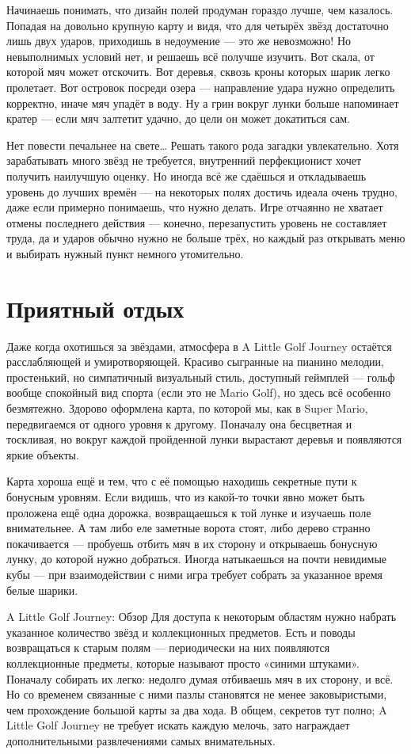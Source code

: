 \documentclass{article}
\begin{document}
Начинаешь понимать, что дизайн полей продуман гораздо лучше, чем казалось. Попадая на довольно крупную карту и видя, что для четырёх звёзд достаточно лишь двух ударов, приходишь в недоумение — это же невозможно! Но невыполнимых условий нет, и решаешь всё получше изучить. Вот скала, от которой мяч может отскочить. Вот деревья, сквозь кроны которых шарик легко пролетает. Вот островок посреди озера — направление удара нужно определить корректно, иначе мяч упадёт в воду. Ну а грин вокруг лунки больше напоминает кратер — если мяч залтетит удачно, до цели он может докатиться сам.


Нет повести печальнее на свете…
Решать такого рода загадки увлекательно. Хотя зарабатывать много звёзд не требуется, внутренний перфекционист хочет получить наилучшую оценку. Но иногда всё же сдаёшься и откладываешь уровень до лучших времён — на некоторых полях достичь идеала очень трудно, даже если примерно понимаешь, что нужно делать. Игре отчаянно не хватает отмены последнего действия — конечно, перезапустить уровень не составляет труда, да и ударов обычно нужно не больше трёх, но каждый раз открывать меню и выбирать нужный пункт немного утомительно.

\section{Приятный отдых}
Даже когда охотишься за звёздами, атмосфера в A Little Golf Journey остаётся расслабляющей и умиротворяющей. Красиво сыгранные на пианино мелодии, простенький, но симпатичный визуальный стиль, доступный геймплей — гольф вообще спокойный вид спорта (если это не Mario Golf), но здесь всё особенно безмятежно. Здорово оформлена карта, по которой мы, как в Super Mario, передвигаемся от одного уровня к другому. Поначалу она бесцветная и тоскливая, но вокруг каждой пройденной лунки вырастают деревья и появляются яркие объекты.

Карта хороша ещё и тем, что с её помощью находишь секретные пути к бонусным уровням. Если видишь, что из какой-то точки явно может быть проложена ещё одна дорожка, возвращаешься к той лунке и изучаешь поле внимательнее. А там либо еле заметные ворота стоят, либо дерево странно покачивается — пробуешь отбить мяч в их сторону и открываешь бонусную лунку, до которой нужно добраться. Иногда натыкаешься на почти невидимые кубы — при взаимодействии с ними игра требует собрать за указанное время белые шарики.

A Little Golf Journey: Обзор
Для доступа к некоторым областям нужно набрать указанное количество звёзд и коллекционных предметов.
Есть и поводы возвращаться к старым полям — периодически на них появляются коллекционные предметы, которые называют просто «синими штуками». Поначалу собирать их легко: недолго думая отбиваешь мяч в их сторону, и всё. Но со временем связанные с ними пазлы становятся не менее заковыристыми, чем прохождение большой карты за два хода. В общем, секретов тут полно; A Little Golf Journey не требует искать каждую мелочь, зато награждает дополнительными развлечениями самых внимательных.
\end{document}

